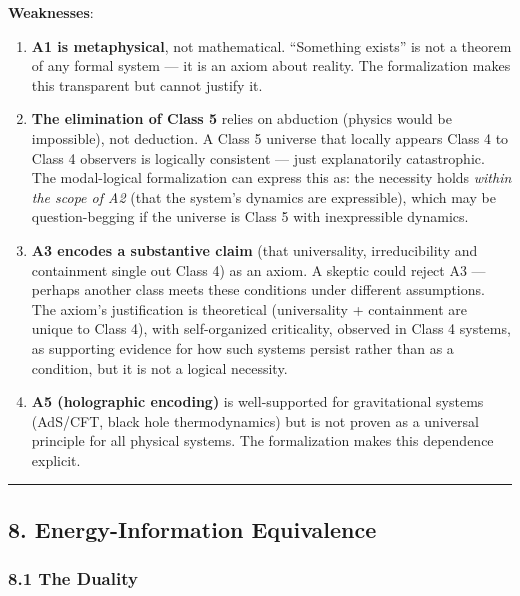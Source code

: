 \documentclass[
]{article}
\begin{document}
\textbf{Weaknesses}:

\begin{enumerate}
\def\labelenumi{\arabic{enumi}.}
\item
  \textbf{A1 is metaphysical}, not mathematical. ``Something exists'' is
  not a theorem of any formal system --- it is an axiom about reality.
  The formalization makes this transparent but cannot justify it.
\item
  \textbf{The elimination of Class 5} relies on abduction (physics would
  be impossible), not deduction. A Class 5 universe that locally appears
  Class 4 to Class 4 observers is logically consistent --- just
  explanatorily catastrophic. The modal-logical formalization can
  express this as: the necessity holds \emph{within the scope of A2}
  (that the system's dynamics are expressible), which may be
  question-begging if the universe is Class 5 with inexpressible
  dynamics.
\item
  \textbf{A3 encodes a substantive claim} (that universality,
  irreducibility and containment single out Class 4) as an axiom. A
  skeptic could reject A3 --- perhaps another class meets these
  conditions under different assumptions. The axiom's justification is
  theoretical (universality + containment are unique to Class 4), with
  self-organized criticality, observed in Class 4 systems, as supporting
  evidence for how such systems persist rather than as a condition, but
  it is not a logical necessity.
\item
  \textbf{A5 (holographic encoding)} is well-supported for gravitational
  systems (AdS/CFT, black hole thermodynamics) but is not proven as a
  universal principle for all physical systems. The formalization makes
  this dependence explicit.
\end{enumerate}

\begin{center}\rule{0.5\linewidth}{0.5pt}\end{center}

\hypertarget{energy-information-equivalence}{%
\subsection{8. Energy-Information
Equivalence}\label{energy-information-equivalence}}

\hypertarget{the-duality}{%
\subsubsection{8.1 The Duality}\label{the-duality}}
\end{document}
